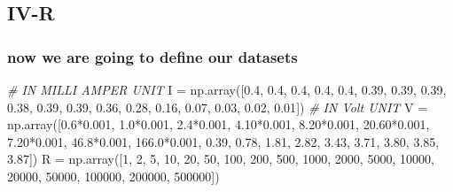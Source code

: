 \documentclass{article}
\newenvironment{Shaded}{}{}
\newcommand{\CommentTok}[1]{\textcolor[rgb]{0.38,0.63,0.69}{\textit{#1}}}
\newcommand{\DecValTok}[1]{\textcolor[rgb]{0.25,0.63,0.44}{#1}}
\newcommand{\FloatTok}[1]{\textcolor[rgb]{0.25,0.63,0.44}{#1}}
\newcommand{\NormalTok}[1]{#1}
\newcommand{\OperatorTok}[1]{\textcolor[rgb]{0.40,0.40,0.40}{#1}}
\begin{document}
\begin{latin}
\hypertarget{iv-r}{%
\section{IV-R}\label{iv-r}}
\hypertarget{now-we-are-going-to-define-our-datasets}{%
\subsubsection{now we are going to define our
datasets}\label{now-we-are-going-to-define-our-datasets}}
\begin{Shaded}
\begin{Highlighting}[]
\CommentTok{\# IN MILLI AMPER UNIT}
\NormalTok{I }\OperatorTok{=}\NormalTok{ np.array([}\FloatTok{0.4}\NormalTok{, }\FloatTok{0.4}\NormalTok{, }\FloatTok{0.4}\NormalTok{, }\FloatTok{0.4}\NormalTok{, }\FloatTok{0.4}\NormalTok{, }\FloatTok{0.39}\NormalTok{, }\FloatTok{0.39}\NormalTok{, }\FloatTok{0.39}\NormalTok{, }\FloatTok{0.38}\NormalTok{, }\FloatTok{0.39}\NormalTok{, }\FloatTok{0.39}\NormalTok{, }\FloatTok{0.36}\NormalTok{, }\FloatTok{0.28}\NormalTok{, }\FloatTok{0.16}\NormalTok{, }\FloatTok{0.07}\NormalTok{, }\FloatTok{0.03}\NormalTok{, }\FloatTok{0.02}\NormalTok{, }\FloatTok{0.01}\NormalTok{])}
\CommentTok{\# IN Volt UNIT}
\NormalTok{V }\OperatorTok{=}\NormalTok{ np.array([}\FloatTok{0.6}\OperatorTok{*}\FloatTok{0.001}\NormalTok{, }\FloatTok{1.0}\OperatorTok{*}\FloatTok{0.001}\NormalTok{, }\FloatTok{2.4}\OperatorTok{*}\FloatTok{0.001}\NormalTok{, }\FloatTok{4.10}\OperatorTok{*}\FloatTok{0.001}\NormalTok{, }\FloatTok{8.20}\OperatorTok{*}\FloatTok{0.001}\NormalTok{, }\FloatTok{20.60}\OperatorTok{*}\FloatTok{0.001}\NormalTok{, }\FloatTok{7.20}\OperatorTok{*}\FloatTok{0.001}\NormalTok{,}
\FloatTok{46.8}\OperatorTok{*}\FloatTok{0.001}\NormalTok{, }\FloatTok{166.0}\OperatorTok{*}\FloatTok{0.001}\NormalTok{, }\FloatTok{0.39}\NormalTok{, }\FloatTok{0.78}\NormalTok{, }\FloatTok{1.81}\NormalTok{, }\FloatTok{2.82}\NormalTok{, }\FloatTok{3.43}\NormalTok{, }\FloatTok{3.71}\NormalTok{, }\FloatTok{3.80}\NormalTok{, }\FloatTok{3.85}\NormalTok{, }\FloatTok{3.87}\NormalTok{])}
\NormalTok{R }\OperatorTok{=}\NormalTok{ np.array([}\DecValTok{1}\NormalTok{, }\DecValTok{2}\NormalTok{, }\DecValTok{5}\NormalTok{, }\DecValTok{10}\NormalTok{, }\DecValTok{20}\NormalTok{, }\DecValTok{50}\NormalTok{, }\DecValTok{100}\NormalTok{, }\DecValTok{200}\NormalTok{, }\DecValTok{500}\NormalTok{, }\DecValTok{1000}\NormalTok{, }\DecValTok{2000}\NormalTok{, }\DecValTok{5000}\NormalTok{, }\DecValTok{10000}\NormalTok{, }\DecValTok{20000}\NormalTok{, }\DecValTok{50000}\NormalTok{, }\DecValTok{100000}\NormalTok{, }\DecValTok{200000}\NormalTok{, }\DecValTok{500000}\NormalTok{])}

\end{Highlighting}
\end{Shaded}
\end{latin}
\end{document}
